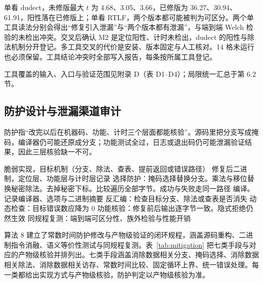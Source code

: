 单看 dudect，未修版最大 $t$ 为 4.68、3.05、3.66，已修版为 36.27、30.94、61.91，阳性落在已修版上；单看 RTLF，两个版本都可能被判为可区分。两个单工具读法分别会得出“修复引入泄漏”与“两个版本都有泄漏”，与端到端 Welch 检验的未检出冲突。交叉后确认 M2 是定位阳性、计时未检出，dudect 的阳性与除法机制分开登记。多工具交叉的代价是安装、版本固定与人工核对。14 格未运行也必须保留。工具结论冲突时全部写入报告，每条按所属工具登记。

工具覆盖的输入、入口与验证范围见附录 D（表 D1--D4）；局限统一汇总于第 6.2 节。

\subsection{防护设计与泄漏渠道审计}

防护指“改完以后在机器码、功能、计时三个层面都能核验”。源码里把分支写成掩码，编译器仍可能还原成分支；功能测试全过，日志或退出码仍可能泄漏验证结果，因此三层核验缺一不可。


\begin{algorithm}[H]
\caption{常数时间防护与产物核验}
\label{alg:mitigation}
\begin{algorithmic}[1]
\Require 脆弱实现，目标机制（分支、除法、查表、提前返回或错误路径）
\Ensure 修复后二进制，定位层、功能层与计时层记录
\State 选择防护：掩码选择替换分支。乘法与移位替换秘密除法。去掉秘密下标。比较遍历全部字节。成功与失败走同一路径
\State 编译。记录编译器、选项与二进制摘要
\State 反汇编：检查目标分支、除法或查表是否消失
\State 动态检查：目标错误数应降为 0
\State 功能核验：修复前后输出逐字节一致。隐式拒绝仍然生效
\State 同规程复测：端到端可区分性、族外检验与性能开销
\end{algorithmic}
\end{algorithm}

算法 8 建立了常数时间防护修改与产物级验证的闭环规程，涵盖源码重构、二进制指令消融、语义等价性测试与同规程复测。表~\ref{tab:mitigation} 把七类手段与对应的产物级核验并排列出。七类手段涵盖消除数据相关分支、掩码选择、消除数据相关除法、消除数据相关访存、常数时间比较、固定循环上界、统一错误处理。每一类都给出实现方式与产物级核验，防护判定以产物级核验为准。

